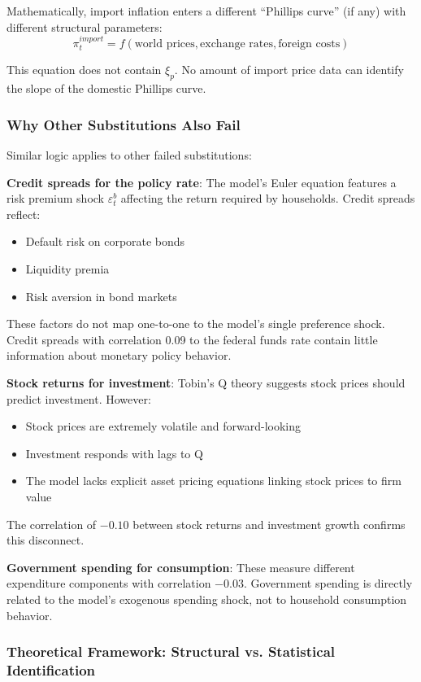 \documentclass[12pt]{article}
\begin{document}
Mathematically, import inflation enters a different ``Phillips curve'' (if any) with different structural parameters:
\[
\pi^{import}_t = f(\text{world prices}, \text{exchange rates}, \text{foreign costs})
\]

This equation does not contain $\xi_p$. No amount of import price data can identify the slope of the domestic Phillips curve.

\subsubsection{Why Other Substitutions Also Fail}

Similar logic applies to other failed substitutions:

\textbf{Credit spreads for the policy rate}: The model's Euler equation features a risk premium shock $\varepsilon^b_t$ affecting the return required by households. Credit spreads reflect:
\begin{itemize}
    \item Default risk on corporate bonds
    \item Liquidity premia
    \item Risk aversion in bond markets
\end{itemize}

These factors do not map one-to-one to the model's single preference shock. Credit spreads with correlation 0.09 to the federal funds rate contain little information about monetary policy behavior.

\textbf{Stock returns for investment}: Tobin's Q theory suggests stock prices should predict investment. However:
\begin{itemize}
    \item Stock prices are extremely volatile and forward-looking
    \item Investment responds with lags to Q
    \item The model lacks explicit asset pricing equations linking stock prices to firm value
\end{itemize}

The correlation of $-0.10$ between stock returns and investment growth confirms this disconnect.

\textbf{Government spending for consumption}: These measure different expenditure components with correlation $-0.03$. Government spending is directly related to the model's exogenous spending shock, not to household consumption behavior.

\subsubsection{Theoretical Framework: Structural vs. Statistical Identification}
\end{document}
